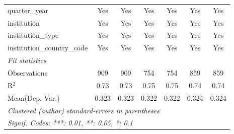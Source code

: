 \begin{tabular}{lcccccc}
   quarter\_year                      & Yes     & Yes     & Yes     & Yes     & Yes     & Yes\\  
   institution                        & Yes     & Yes     & Yes     & Yes     & Yes     & Yes\\  
   institution\_type                  & Yes     & Yes     & Yes     & Yes     & Yes     & Yes\\  
   institution\_country\_code         & Yes     & Yes     & Yes     & Yes     & Yes     & Yes\\  
   \midrule
   \emph{Fit statistics}\\
   Observations                       & 909     & 909     & 754     & 754     & 859     & 859\\  
   R$^2$                              & 0.73    & 0.73    & 0.75    & 0.75    & 0.74    & 0.74\\  
Mean(Dep. Var.) & 0.323 & 0.323 & 0.322 & 0.322 & 0.324 & 0.324 \\
   \midrule \midrule
   \multicolumn{7}{l}{\emph{Clustered (author) standard-errors in parentheses}}\\
   \multicolumn{7}{l}{\emph{Signif. Codes: ***: 0.01, **: 0.05, *: 0.1}}\\
\end{tabular}
\par\endgroup
